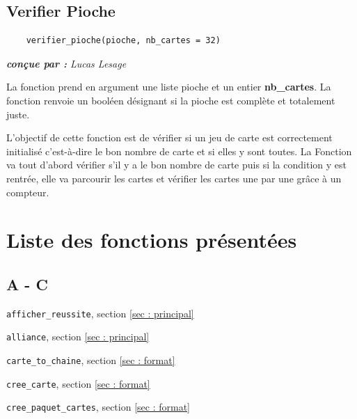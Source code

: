 \documentclass[titlepage]{article}
\begin{document}
\vspace{5mm}

\subsection{Verifier Pioche}
\label{subsec : verif}
\noindent	\begin{minipage}{\textwidth}
	\begin{lstlisting}
	verifier_pioche(pioche, nb_cartes = 32) 
	\end{lstlisting}	
	\end{minipage}
	
\emph{\textbf{conçue par : } Lucas Lesage} \vspace{2mm}\par

La fonction prend en argument une liste pioche et un entier \textbf{nb\_cartes}. La fonction renvoie un booléen désignant si la pioche est complète et totalement juste.

L’objectif de cette fonction est de vérifier si un jeu de carte est correctement initialisé c’est-à-dire le bon nombre de carte et si elles y sont toutes. La Fonction va tout d’abord vérifier s’il y a le bon nombre de carte puis si la condition y est rentrée, elle va parcourir les cartes et vérifier les cartes une par une grâce à un compteur.


\newpage
\section*{Liste des fonctions présentées}

\subsection*{A - C}
\begin{description}
\item \texttt{afficher\_reussite}, section \ref{sec : principal}
\item \texttt{alliance}, section \ref{sec : principal}
\item \texttt{carte\_to\_chaine}, section \ref{sec : format}
\item \texttt{cree\_carte}, section \ref{sec : format}
\item \texttt{cree\_paquet\_cartes}, section \ref{sec : format}
\end{description}
\end{document}

